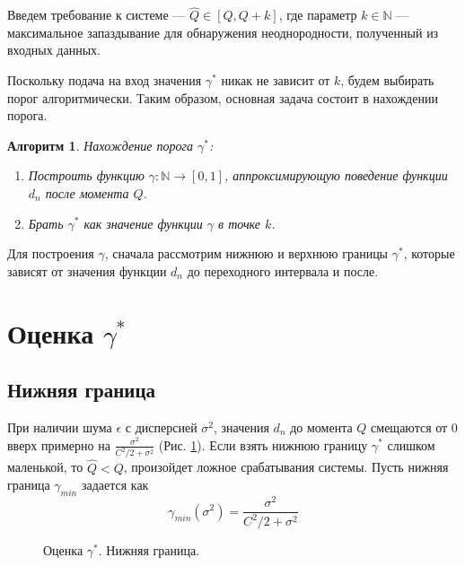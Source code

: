 \documentclass[specialist, substylefile = spbu.rtx,
			   subf, href, 12pt]{disser}
\newtheorem{algorithm}{Алгоритм}
\begin{document}
Введем требование к системе --- $ \hat{Q} \in [Q, Q+k] $, где параметр $ k \in \mathbb{N} $ --- максимальное запаздывание для обнаружения неоднородности, полученный из входных данных. 

Поскольку подача на вход значения $ \gamma^* $ никак не зависит от $ k $, будем выбирать порог алгоритмически. Таким образом, основная задача состоит в нахождении порога. 
\begin{algorithm}\label{algo:fix_gamma}
	Нахождение порога $ \gamma^* $:
	\begin{enumerate}
		\item Построить функцию $ \gamma: \mathbb{N} \rightarrow [0, 1] $, аппроксимирующую поведение функции $ d_n $ после момента $ Q $.
		\item Брать $ \gamma^* $ как значение функции $ \gamma $ в точке $ k $.
	\end{enumerate}
\end{algorithm}

Для построения $ \gamma $, сначала рассмотрим нижнюю и верхнюю границы $ \gamma^* $, которые зависят от значения функции $ d_n $ до переходного интервала и после.

\section{Оценка $ \gamma^* $}
\subsection{Нижняя граница}\label{ch:lower_border}

При наличии шума $ \epsilon $ с дисперсией $ \sigma^2 $, значения $ d_n $ до момента $ Q $ смещаются от $ 0 $ вверх примерно на $ \frac{\sigma^2}{C^2/2 + \sigma^2} $ (Рис. \ref{pic:estimate_gamma_lower}). Если взять нижнюю границу $ \gamma^* $ слишком маленькой, то $ \hat{Q} < Q $, произойдет ложное срабатывания системы. Пусть нижняя граница $ \gamma_{min} $ задается как
\begin{equation}\label{eq:gamma_min}
	\gamma_{min}(\sigma^2) = \frac{\sigma^2}{C^2/2 + \sigma^2}
\end{equation}

\begin{figure}[!hhh]
	\caption{Оценка $ \gamma^* $. Нижняя граница.}
	\label{pic:estimate_gamma_lower}
\end{figure}
\end{document}
